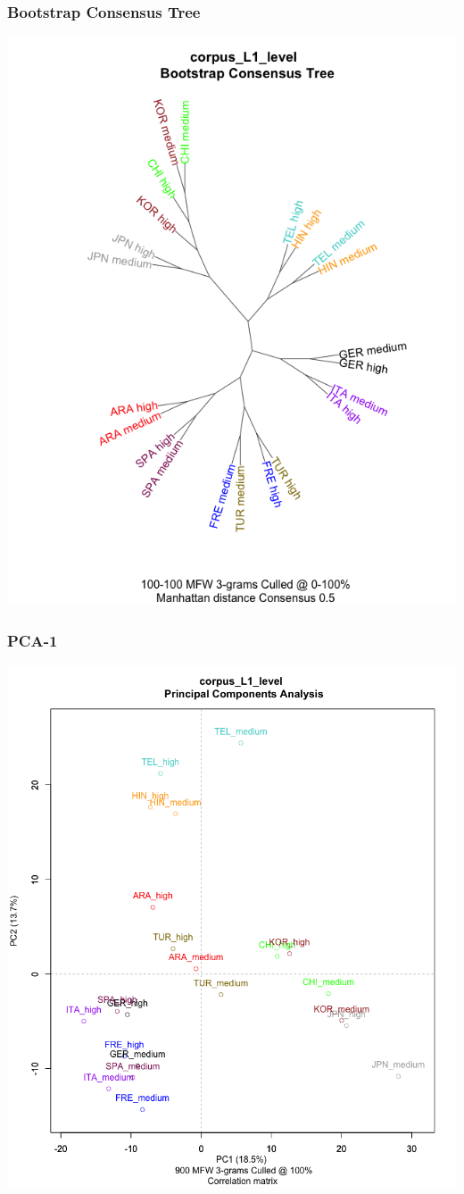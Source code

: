 \documentclass{beamer}
\begin{document}
\begin{frame}
\frametitle{Bootstrap Consensus Tree}
  \includegraphics[width=.7\textwidth]{alt1.png}
\end{frame}

\begin{frame}
\frametitle{PCA-1}
  \includegraphics[width=.7\textwidth]{alt2.png}
\end{frame}
\end{document}
